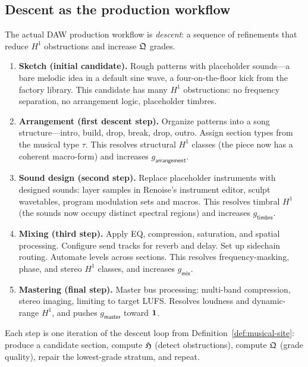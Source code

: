 \subsection{Descent as the production workflow}
\label{ssec:musical-descent}

The actual DAW production workflow is \emph{descent}: a sequence of
refinements that reduce $H^1$ obstructions and increase $\mathfrak{Q}$
grades.

\begin{enumerate}
  \item \textbf{Sketch (initial candidate).}\;
        Rough patterns with placeholder sounds---a bare melodic
        idea in a default sine wave, a four-on-the-floor kick from
        the factory library.  This candidate has many $H^1$
        obstructions: no frequency separation, no arrangement
        logic, placeholder timbres.
  \item \textbf{Arrangement (first descent step).}\;
        Organize patterns into a song structure---intro, build,
        drop, break, drop, outro.  Assign section types from the
        musical type $\tau$.  This resolves structural $H^1$
        classes (the piece now has a coherent macro-form) and
        increases $g_{\mathsf{arrangement}}$.
  \item \textbf{Sound design (second step).}\;
        Replace placeholder instruments with designed sounds:
        layer samples in Renoise's instrument editor, sculpt
        wavetables, program modulation sets and macros.  This
        resolves timbral $H^1$ (the sounds now occupy distinct
        spectral regions) and increases $g_{\mathsf{timbre}}$.
  \item \textbf{Mixing (third step).}\;
        Apply EQ, compression, saturation, and spatial
        processing.  Configure send tracks for reverb and delay.
        Set up sidechain routing.  Automate levels across
        sections.  This resolves frequency-masking, phase, and
        stereo $H^1$ classes, and increases $g_{\mathsf{mix}}$.
  \item \textbf{Mastering (final step).}\;
        Master bus processing: multi-band compression, stereo
        imaging, limiting to target LUFS.  Resolves loudness and
        dynamic-range $H^1$, and pushes $g_{\mathsf{master}}$
        toward $\mathbf{1}$.
\end{enumerate}

Each step is one iteration of the descent loop from
Definition~\ref{def:musical-site}: produce a candidate section,
compute $\mathfrak{H}$ (detect obstructions), compute $\mathfrak{Q}$ (grade
quality), repair the lowest-grade stratum, and repeat.

